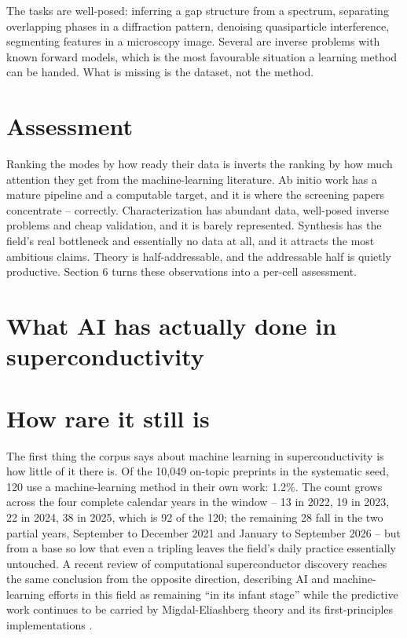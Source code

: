 \documentclass[
  11pt,
]{article}
\begin{document}
The tasks are well-posed: inferring a gap structure from a spectrum,
separating overlapping phases in a diffraction pattern, denoising
quasiparticle interference, segmenting features in a microscopy image.
Several are inverse problems with known forward models, which is the
most favourable situation a learning method can be handed. What is
missing is the dataset, not the method.

\section{Assessment}\label{assessment-1}

Ranking the modes by how ready their data is inverts the ranking by how
much attention they get from the machine-learning literature. Ab initio
work has a mature pipeline and a computable target, and it is where the
screening papers concentrate -- correctly. Characterization has abundant
data, well-posed inverse problems and cheap validation, and it is barely
represented. Synthesis has the field's real bottleneck and essentially
no data at all, and it attracts the most ambitious claims. Theory is
half-addressable, and the addressable half is quietly productive.
Section 6 turns these observations into a per-cell assessment.

\section{What AI has actually done in
superconductivity}\label{what-ai-has-actually-done-in-superconductivity}

\section{How rare it still is}\label{how-rare-it-still-is}

The first thing the corpus says about machine learning in
superconductivity is how little of it there is. Of the 10,049 on-topic
preprints in the systematic seed, 120 use a machine-learning method in
their own work: 1.2\%. The count grows across the four complete calendar
years in the window -- 13 in 2022, 19 in 2023, 22 in 2024, 38 in 2025,
which is 92 of the 120; the remaining 28 fall in the two partial years,
September to December 2021 and January to September 2026 -- but from a
base so low that even a tripling leaves the field's daily practice
essentially untouched. A recent review of computational superconductor
discovery reaches the same conclusion from the opposite direction,
describing AI and machine-learning efforts in this field as remaining
``in its infant stage'' while the predictive work continues to be
carried by Migdal-Eliashberg theory and its first-principles
implementations \citep{tran2025superconductor}.
\end{document}
